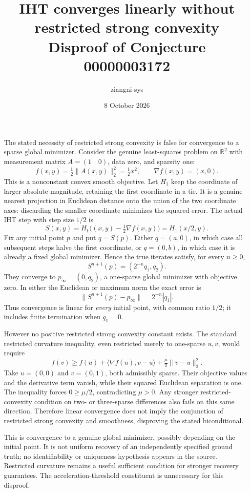 \documentclass[11pt]{article}
\title{IHT converges linearly without restricted strong convexity\\Disproof of Conjecture 00000003172}
\author{ziangni-sys}\date{8 October 2026}
\begin{document}
\maketitle
The stated necessity of restricted strong convexity is false for convergence to a sparse global minimizer. Consider the genuine least-squares problem on $\mathbb R^2$ with measurement matrix $A=(1\quad0)$, data zero, and sparsity one:
\[
 f(x,y)=\tfrac12\|A(x,y)\|_2^2=\tfrac12 x^2,\qquad \nabla f(x,y)=(x,0).
\]
This is a nonconstant convex smooth objective. Let $H_1$ keep the coordinate of larger absolute magnitude, retaining the first coordinate in a tie. It is a genuine nearest projection in Euclidean distance onto the union of the two coordinate axes: discarding the smaller coordinate minimizes the squared error. The actual IHT step with step size $1/2$ is
\[
 S(x,y)=H_1\bigl((x,y)-\tfrac12\nabla f(x,y)\bigr)=H_1(x/2,y).
\]
Fix any initial point $p$ and put $q=S(p)$. Either $q=(a,0)$, in which case all subsequent steps halve the first coordinate, or $q=(0,b)$, in which case it is already a fixed global minimizer. Hence the true iterates satisfy, for every $n\ge0$,
\[
 S^{n+1}(p)=(2^{-n}q_1,q_2).
\]
They converge to $p_\infty=(0,q_2)$, a one-sparse global minimizer with objective zero. In either the Euclidean or maximum norm the exact error is
\[
 \|S^{n+1}(p)-p_\infty\|=2^{-n}|q_1|.
\]
Thus convergence is linear for \emph{every} initial point, with common ratio $1/2$; it includes finite termination when $q_1=0$.

However no positive restricted strong convexity constant exists. The standard restricted curvature inequality, even restricted merely to one-sparse $u,v$, would require
\[
 f(v)\ge f(u)+\langle\nabla f(u),v-u\rangle+\tfrac\mu2\|v-u\|_2^2.
\]
Take $u=(0,0)$ and $v=(0,1)$, both admissibly sparse. Their objective values and the derivative term vanish, while their squared Euclidean separation is one. The inequality forces $0\ge\mu/2$, contradicting $\mu>0$. Any stronger restricted-convexity condition on two- or three-sparse differences also fails on this same direction. Therefore linear convergence does not imply the conjunction of restricted strong convexity and smoothness, disproving the stated biconditional.

This is convergence to a genuine global minimizer, possibly depending on the initial point. It is not uniform recovery of an independently specified ground truth; no identifiability or uniqueness hypothesis appears in the source. Restricted curvature remains a useful sufficient condition for stronger recovery guarantees. The acceleration-threshold constituent is unnecessary for this disproof.
\end{document}
